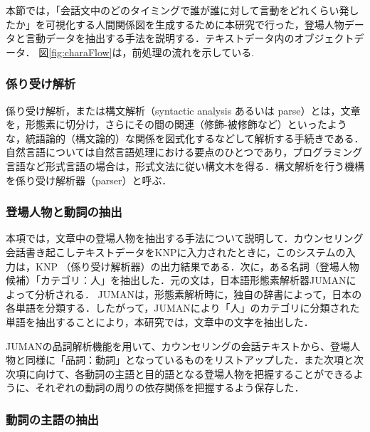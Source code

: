 \documentclass[shuuron]{kuee}
\begin{document}
本節では，「会話文中のどのタイミングで誰が誰に対して言動をどれくらい発したか」を可視化する人間関係図を生成するために本研究で行った，登場人物データと言動データを抽出する手法を説明する．テキストデータ内のオブジェクトデータ． 図\ref{fig:charaFlow}は，前処理の流れを示している.








\subsubsection{係り受け解析}


係り受け解析，または構文解析（syntactic analysis あるいは parse）とは，文章を，形態素に切分け，さらにその間の関連（修飾-被修飾など）といったような，統語論的（構文論的）な関係を図式化するなどして解析する手続きである．自然言語については自然言語処理における要点のひとつであり，プログラミング言語など形式言語の場合は，形式文法に従い構文木を得る．構文解析を行う機構を係り受け解析器（parser）と呼ぶ．



\subsubsection{登場人物と動詞の抽出}


本項では，文章中の登場人物を抽出する手法について説明して．カウンセリング会話書き起こしテキストデータをKNPに入力されたときに，このシステムの入力は，KNP \cite{KNP}（係り受け解析器）の出力結果である．次に，ある名詞（登場人物候補）「カテゴリ：人」を抽出した．元の文は，日本語形態素解析器JUMAN\cite{juman}によって分析される． JUMANは，形態素解析時に，独自の辞書によって，日本の各単語を分類する．したがって，JUMANにより「人」のカテゴリに分類された単語を抽出することにより，本研究では，文章中の文字を抽出した．

JUMANの品詞解析機能を用いて、カウンセリングの会話テキストから、登場人物と同様に「品詞：動詞」となっているものをリストアップした．また次項と次次項に向けて、各動詞の主語と目的語となる登場人物を把握することができるように、それぞれの動詞の周りの依存関係を把握するよう保存した．



\subsubsection{動詞の主語の抽出}
\end{document}
